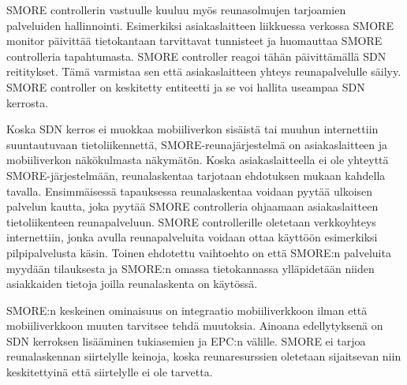 SMORE controllerin vastuulle kuuluu myös reunasolmujen tarjoamien palveluiden hallinnointi. 
Esimerkiksi asiakaslaitteen liikkuessa verkossa SMORE monitor päivittää tietokantaan tarvittavat tunnisteet ja huomauttaa SMORE controlleria tapahtumasta. SMORE controller reagoi tähän päivittämällä SDN reititykset. Tämä varmistaa sen että asiakaslaitteen yhteys reunapalvelulle säilyy. SMORE controller on keskitetty entiteetti ja se voi hallita useampaa SDN kerrosta.

Koska SDN kerros ei muokkaa mobiiliverkon sisäistä tai muuhun  internettiin suuntautuvaan tietoliikennettä, SMORE-reunajärjestelmä on asiakaslaitteen ja mobiiliverkon näkökulmasta näkymätön.
Koska asiakaslaitteella ei ole yhteyttä SMORE-järjestelmään, reunalaskentaa tarjotaan ehdotuksen mukaan kahdella tavalla. Ensimmäisessä tapauksessa reunalaskentaa voidaan pyytää ulkoisen palvelun kautta, joka pyytää SMORE controlleria ohjaamaan asiakaslaitteen tietoliikenteen reunapalveluun.
SMORE controllerille oletetaan verkkoyhteys internettiin, jonka avulla reunapalveluita voidaan ottaa käyttöön esimerkiksi pilpipalvelusta käsin.
Toinen ehdotettu vaihtoehto on että SMORE:n palveluita myydään tilauksesta ja SMORE:n omassa tietokannassa ylläpidetään niiden asiakkaiden tietoja joilla reunalaskenta on käytössä. 

SMORE:n keskeinen ominaisuus on integraatio mobiiliverkkoon ilman että mobiiliverkkoon muuten tarvitsee tehdä muutoksia. Ainoana edellytyksenä on SDN kerroksen lisääminen tukiasemien ja EPC:n välille. SMORE ei tarjoa reunalaskennan siirtelylle keinoja, koska reunaresurssien oletetaan sijaitsevan niin keskitettyinä että siirtelylle ei ole tarvetta.

